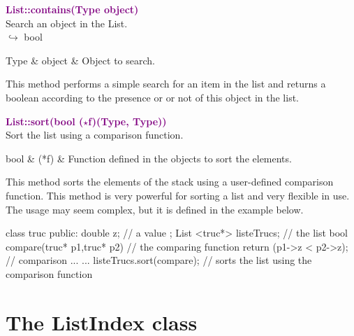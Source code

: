 \textcolor{purple}{\textbf{List::contains(Type object)}}\label{List::contains(Type object)}\\
Search an object in the List.\\ \hspace*{10mm}$\hookrightarrow$ bool

\begin{tcolorbox}[width=\textwidth,myArgs,tabularx={ll|R}]
Type & object & Object to search.
\end{tcolorbox}

This method performs a simple search for an item in the list and returns a boolean according to the presence or or not of this object in the list.

\textcolor{purple}{\textbf{List::sort(bool ($\star$f)(Type, Type))}}\label{List::sort(bool (*f)(Type, Type))}\\
Sort the list using a comparison function.

\begin{tcolorbox}[width=\textwidth,myArgs,tabularx={ll|R}]
bool & (*f) & Function defined in the objects to sort the elements.
\end{tcolorbox}

This method sorts the elements of the stack using a user-defined comparison function.
This method is very powerful for sorting a list and very flexible in use.
The usage may seem complex, but it is defined in the example below.
\begin{CppListing}
class truc
{
  public:
  double z; // a value
};
List <truc*> listeTrucs; // the list
bool compare(truc* p1,truc* p2) // the comparing function
{
  return (p1->z < p2->z); // comparison
}
...
{
...
listeTrucs.sort(compare); // sorts the list using the comparison function
}
\end{CppListing}

\section{The ListIndex class}

